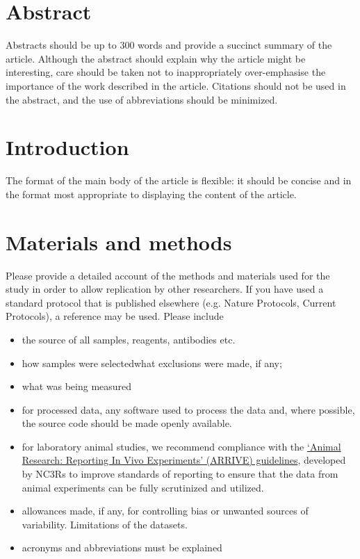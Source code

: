 \documentclass[10pt]{article}
\begin{document}
\section{Abstract} 
Abstracts should be up to 300 words and provide a succinct summary of the article. Although the abstract should explain why the article might be interesting, care should be taken not to inappropriately over-emphasise the importance of the work described in the article. Citations should not be used in the abstract, and the use of abbreviations should be minimized.

\section*{Introduction} 
The format of the main body of the article is flexible: it should be concise and in the format most appropriate to displaying the content of the article.

\section*{Materials and methods} 
Please provide a detailed account of the methods and materials used for the study in order to allow replication by other researchers.
If you have used a standard protocol that is published elsewhere (e.g. Nature Protocols, Current Protocols), a reference may be used. Please include \begin{itemize}
\item 
the source of all samples, reagents, antibodies etc.
\item 
 how samples were selectedwhat exclusions were made, if any;
\item 
what was being measured
\item 
for processed data, any software used to process the data and, where possible, the source code should be made openly available.\item 

for laboratory animal studies, we recommend compliance with the \href{http://www.nc3rs.org.uk/downloaddoc.asp?id=1206&page=1357&skin=0}{`Animal Research: Reporting In Vivo Experiments' (ARRIVE) guidelines}, developed by NC3Rs to improve standards of reporting to ensure that the data from animal experiments can be fully scrutinized and utilized.\item 

allowances made, if any, for controlling bias or unwanted sources of variability.
Limitations of the datasets.\item 

acronyms and abbreviations must be explained
\end{itemize}
\end{document}
